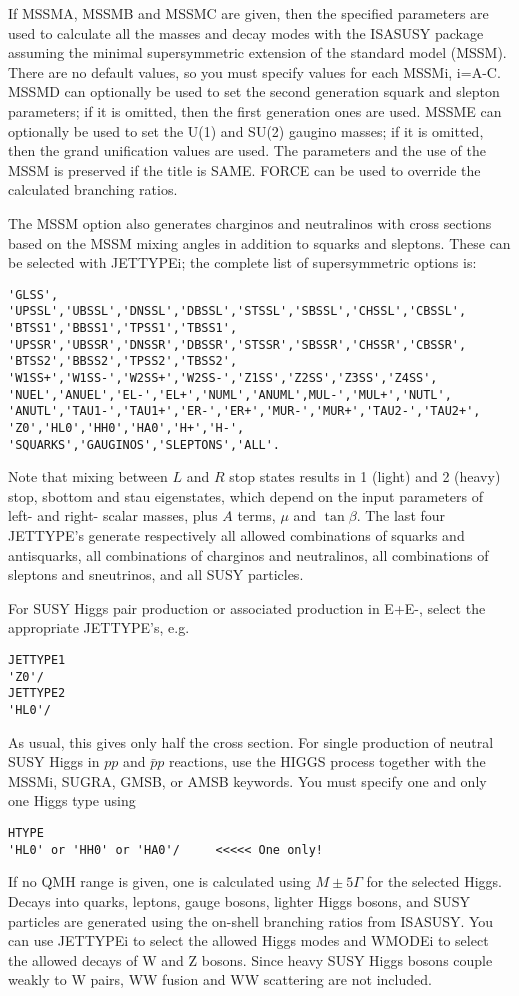       If MSSMA, MSSMB and MSSMC are given, then the specified parameters
are used to calculate all the masses and decay modes with the ISASUSY
package assuming the minimal supersymmetric extension of the standard
model (MSSM). There are no default values, so you must specify values
for each MSSMi, i=A-C. MSSMD can optionally be used to set the second
generation squark and slepton parameters; if it is omitted, then the
first generation ones are used. MSSME can optionally be used to set the
U(1) and SU(2) gaugino masses; if it is omitted, then the grand
unification values are used. The parameters and the use of the MSSM is
preserved if the title is SAME. FORCE can be used to override the
calculated branching ratios. 

      The MSSM option also generates charginos and neutralinos with
cross sections based on the MSSM mixing angles in addition to squarks
and sleptons. These can be selected with JETTYPEi; the complete list of
supersymmetric options is:
\begin{verbatim}
'GLSS',
'UPSSL','UBSSL','DNSSL','DBSSL','STSSL','SBSSL','CHSSL','CBSSL',
'BTSS1','BBSS1','TPSS1','TBSS1',
'UPSSR','UBSSR','DNSSR','DBSSR','STSSR','SBSSR','CHSSR','CBSSR',
'BTSS2','BBSS2','TPSS2','TBSS2',
'W1SS+','W1SS-','W2SS+','W2SS-','Z1SS','Z2SS','Z3SS','Z4SS',
'NUEL','ANUEL','EL-','EL+','NUML','ANUML',MUL-','MUL+','NUTL',
'ANUTL','TAU1-','TAU1+','ER-','ER+','MUR-','MUR+','TAU2-','TAU2+',
'Z0','HL0','HH0','HA0','H+','H-',
'SQUARKS','GAUGINOS','SLEPTONS','ALL'.
\end{verbatim}
Note that mixing between $L$ and $R$ stop states results in 1 (light)
and 2 (heavy) stop, sbottom and stau eigenstates, which depend on the
input parameters of left- and right- scalar masses, plus $A$ terms,
$\mu$ and $\tan\beta$. The last four JETTYPE's generate respectively
all allowed combinations of squarks and antisquarks, all combinations
of charginos and neutralinos, all combinations of sleptons and
sneutrinos, and all SUSY particles. 

      For SUSY Higgs pair production or associated production in E+E-,
select the appropriate JETTYPE's, e.g.
\begin{verbatim}
JETTYPE1
'Z0'/
JETTYPE2
'HL0'/
\end{verbatim}

As usual, this gives only half the cross section. For single production
of neutral SUSY Higgs in $pp$ and $\bar pp$ reactions, use the HIGGS
process together with the MSSMi, SUGRA, GMSB, or AMSB keywords. You must
specify one and only one Higgs type using
\begin{verbatim}
HTYPE
'HL0' or 'HH0' or 'HA0'/     <<<<< One only!
\end{verbatim}
If no QMH range is given, one is calculated using $M \pm 5 \Gamma$ for
the selected Higgs. Decays into quarks, leptons, gauge bosons, lighter
Higgs bosons, and SUSY particles are generated using the on-shell
branching ratios from ISASUSY. You can use JETTYPEi to select the
allowed Higgs modes and WMODEi to select the allowed decays of W and Z
bosons. Since heavy SUSY Higgs bosons couple weakly to W pairs, WW
fusion and WW scattering are not included. 

